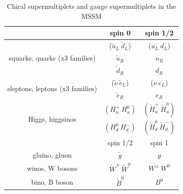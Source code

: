 \begin{table}[h!]
\centering
\caption[Chiral and gauge supermultiplets of MSSM]{Chiral supermultiplets and gauge supermultiplets in the MSSM \cite{Martin:1997ns}}
\label{tab:SUSY}
\begin{tabular}{|c|c|c|}
\hline   & spin 0  & spin 1/2  \\ 
\hline  
\multirow{3}{*}{squarks, quarks (x3 families)} & ($\tilde{u}_L\ \tilde{d}_L$) & (${u_L}\ {d_L}$) \\ 
								               & $\tilde{u}_R$				& $u_R$\\
                      						   & $\tilde{d}_R$				& $d_R$\\ \hline
\multirow{2}{*}{sleptons, leptons (x3 families)} & ($\tilde{\nu}\ \tilde{e}_L$) & (${\nu}\ {e_L}$) \\ 
                      						   & $\tilde{e}_R$				& $e_R$\\ \hline
\multirow{2}{*}{Higgs, higgsinos}			   & $(H^{+}_u\ H^{0}_u)$       & $(\tilde{H}^{+}_u\ \tilde{H}^{0}_u)$\\
											   & $(H^{0}_d\ H^{-}_d)$       & $(\tilde{H}^{0}_d\ \tilde{H}^{-}_d)$\\ \hline
                      						   & spin 1/2					& spin 1 \\ \hline
                  		gluino, gluon		   & $\tilde{g}$				& $g$ \\
                  		winos, W bosons		   & $\tilde{W}^\pm\ \tilde{W}^0$ & $W^\pm\ W^0$ \\
                  		bino, B boson		   & $\tilde{B}^0$				& $B^0$\\ \hline
\end{tabular} 
\end{table}

